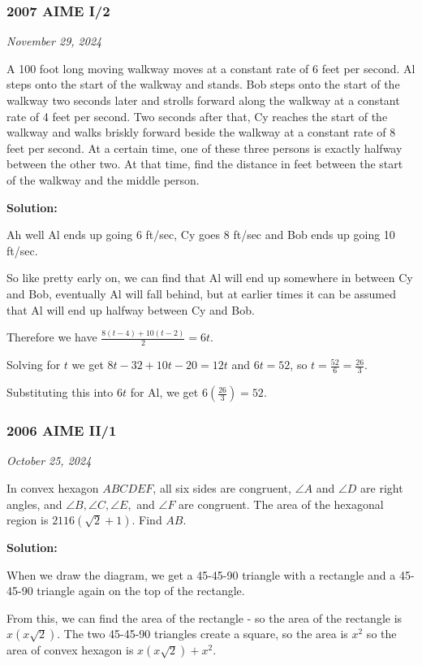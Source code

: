 \documentclass[../mathproblems.tex]{subfiles}
\begin{document}
\subsubsection*{2007 AIME I/2} 
\textit{November 29, 2024}

A 100 foot long moving walkway moves at a constant rate of 6 feet per second. Al steps onto the start of the walkway and stands. Bob steps onto the start of the walkway two seconds later and strolls forward along the walkway at a constant rate of 4 feet per second. Two seconds after that, Cy reaches the start of the walkway and walks briskly forward beside the walkway at a constant rate of 8 feet per second. At a certain time, one of these three persons is exactly halfway between the other two. At that time, find the distance in feet between the start of the walkway and the middle person.

\textbf{Solution:}

Ah well Al ends up going 6 ft/sec, Cy goes 8 ft/sec and Bob ends up going 10 ft/sec.

So like pretty early on, we can find that Al will end up somewhere in between Cy and Bob, eventually Al will fall behind, but at earlier times it can be assumed that Al will end up halfway between Cy and Bob.

Therefore we have $\frac{8(t-4)+10(t-2)}{2} = 6t$.

Solving for $t$ we get $8t-32+10t-20=12t$ and $6t=52$, so $t=\frac{52}{6}=\frac{26}{3}$.

Substituting this into $6t$ for Al, we get $6\left(\frac{26}{3}\right) = \boxed{52}$.

\noindent\hrulefill
\subsubsection*{2006 AIME II/1} 
\textit{October 25, 2024}

In convex hexagon $ABCDEF$, all six sides are congruent, $\angle A$ and $\angle D$ are right angles, and $\angle B, \angle C, \angle E,$ and $\angle F$ are congruent. The area of the hexagonal region is $2116(\sqrt{2}+1).$ Find $AB$.

\textbf{Solution:}

When we draw the diagram, we get a 45-45-90 triangle with a rectangle and a 45-45-90 triangle again on the top of the rectangle.

From this, we can find the area of the rectangle - so the area of the rectangle is $x(x\sqrt{2})$. The two 45-45-90 triangles create a square, so the area is $x^2$ so the area of convex hexagon is $x(x\sqrt{2})+x^2$. 
\end{document}
